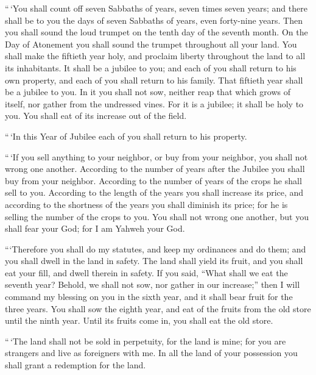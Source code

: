  ``\,`You shall count off seven Sabbaths of years, seven
times seven years; and there shall be to you the days of seven Sabbaths
of years, even forty-nine years.  Then you shall sound the
loud trumpet on the tenth day of the seventh month. On the Day of
Atonement you shall sound the trumpet throughout all your land.
 You shall make the fiftieth year holy, and proclaim
liberty throughout the land to all its inhabitants. It shall be a
jubilee to you; and each of you shall return to his own property, and
each of you shall return to his family.  That fiftieth year
shall be a jubilee to you. In it you shall not sow, neither reap that
which grows of itself, nor gather from the undressed vines.
 For it is a jubilee; it shall be holy to you. You shall
eat of its increase out of the field.

 ``\,`In this Year of Jubilee each of you shall return to
his property.

 ``\,`If you sell anything to your neighbor, or buy from
your neighbor, you shall not wrong one another.  According
to the number of years after the Jubilee you shall buy from your
neighbor. According to the number of years of the crops he shall sell to
you.  According to the length of the years you shall
increase its price, and according to the shortness of the years you
shall diminish its price; for he is selling the number of the crops to
you.  You shall not wrong one another, but you shall fear
your God; for I am Yahweh your God.

 ```Therefore you shall do my statutes, and keep my
ordinances and do them; and you shall dwell in the land in safety.
 The land shall yield its fruit, and you shall eat your
fill, and dwell therein in safety.  If you said, ``What
shall we eat the seventh year? Behold, we shall not sow, nor gather in
our increase;''  then I will command my blessing on you in
the sixth year, and it shall bear fruit for the three years.
 You shall sow the eighth year, and eat of the fruits from
the old store until the ninth year. Until its fruits come in, you shall
eat the old store.

 ``\,`The land shall not be sold in perpetuity, for the
land is mine; for you are strangers and live as foreigners with me.
 In all the land of your possession you shall grant a
redemption for the land.

